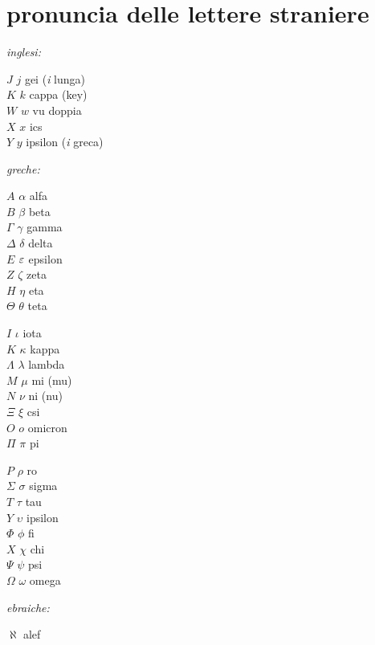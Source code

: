 \section*{pronuncia delle lettere straniere}

\emph{inglesi:}
\begin{center}
\begin{minipage}{3cm}
$J$ $j$ gei (\emph{i} lunga) \\
$K$ $k$ cappa (key) \\
$W$ $w$ vu doppia \\
$X$ $x$ ics \\
$Y$ $y$ ipsilon (\emph{i} greca) 
\end{minipage}
\end{center}
%
\emph{greche:}
\begin{center}
\begin{minipage}{3cm}
$A$ $\alpha$ alfa \index{$\alpha$} \\
$B$ $\beta$ beta \index{$\beta$}\\
$\Gamma$ $\gamma$ gamma \index{$\gamma$} \\
$\Delta$ $\delta$ delta \index{$\delta$} \\
$E$ $\eps$ epsilon \index{$\eps$} \\
$Z$ $\zeta$ zeta\footnotemark[1] \\
$H$ $\eta$ eta  \\
$\Theta$ $\theta$ teta \index{$\theta$}
\end{minipage}%
\begin{minipage}{3cm}
$I$ $\iota$ iota  \\
$K$ $\kappa$ kappa\footnotemark[2]  \\
$\Lambda$ $\lambda$ lambda \index{$\lambda$} \\
$M$ $\mu$ mi (mu) \index{$\mu$} \\
$N$ $\nu$ ni (nu) \index{$\nu$} \\
$\Xi$ $\xi$ csi  \\
$O$ $o$ omicron  \\
$\Pi$ $\pi$ pi\footnotemark[3] \index{$\pi$}
\end{minipage}%
%
\begin{minipage}{3cm}
$P$ $\rho$ ro \index{$\rho$} \\
$\Sigma$ $\sigma$ sigma \index{$\sigma$} \index{$\Sigma$} \\
$T$ $\tau$ tau  \index{$\tau$}\\
$Y$ $\upsilon$ ipsilon\footnotemark[4]\\
$\Phi$ $\phi$ fi \index{$\phi$} \\
$X$ $\chi$ chi \index{$\chi$} \\
$\Psi$ $\psi$ psi \index{$\psi$} \\
$\Omega$ $\omega$ omega \index{$\omega$}
\end{minipage}
\end{center}
%
\emph{ebraiche:}
\begin{center}
\begin{minipage}{3cm}
$\aleph$ alef
\end{minipage}
\end{center}

